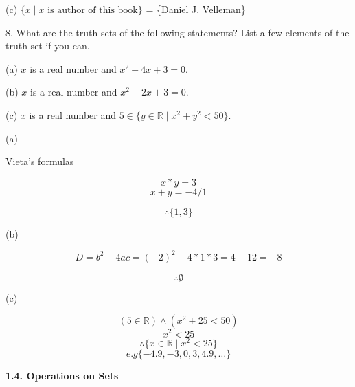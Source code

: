 \documentclass{article}
\begin{document}
(c) $\{x \mid x \text{ is author of this book}\}$ = \{Daniel J. Velleman\}
\vspace{30pt}

8. What are the truth sets of the following statements? List a few elements of
the truth set if you can.

\hspace{12pt}(a) $x$ is a real number and $x^2 - 4x + 3 = 0$.

\hspace{12pt}(b) $x$ is a real number and $x^2 - 2x + 3 = 0$.

\hspace{12pt}(c) $x$ is a real number and $5 \in \{y \in \mathbb{R} \mid x^2 + y^2 < 50\}$.
\vspace{20pt}

(a)

Vieta's formulas

$$x * y = 3$$
$$x + y = -4/1$$

$$\therefore \{1, 3\}$$

\vspace{10pt}

(b)

$$D = b^2 - 4ac = (-2)^2 - 4*1*3 = 4 - 12 = -8$$

$$\therefore \emptyset$$

\vspace{10pt}

(c)

$$(5 \in \mathbb{R}) \land (x^2 + 25 < 50)$$
$$x^2 < 25$$
$$\therefore \{x \in \mathbb{R} \mid x^2 < 25\}$$
$$e.g \{-4.9, -3, 0, 3, 4.9, \dots\}$$
\vspace{50pt}

\textbf{1.4. Operations on Sets}
\vspace{40pt}
\end{document}
